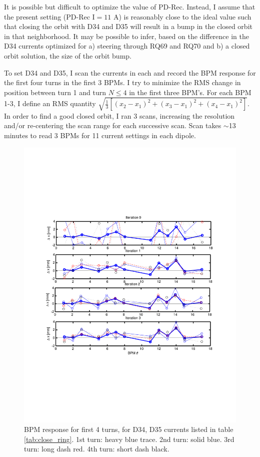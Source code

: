 It is possible but difficult to optimize the value of PD-Rec. Instead, I assume that the present setting (PD-Rec I$=11$ A) is reasonably close to the ideal value such that closing the orbit with D34 and D35 will result in a bump in the closed orbit in that neighborhood. It may be possible to infer, based on the difference in the D34 currents optimized for a) steering through RQ69 and RQ70 and b) a closed orbit solution, the size of the orbit bump. 

To set D34 and D35, I scan the currents in each and record the BPM response for the first four turns in the first 3 BPMs. I try to minimize the RMS change in position between turn 1 and turn $N\le4$ in the first three BPM's. For each BPM 1-3, I define an RMS quantity $\sqrt{\frac{1}{3}\left[ \left(x_2-x_1\right)^2+\left(x_3-x_1\right)^2+\left(x_4-x_1\right)^2\right]}$. In order to find a good closed orbit, I ran 3 scans, increasing the resolution and/or re-centering the scan range for each successive scan. Scan takes $\sim$13 minutes to read 3 BPMs for 11 current settings in each dipole. 

\begin{figure}[htb]
\centering
\includegraphics[width=\textwidth,trim={.5in 2.7in .5in 2.7in},clip]{4.figures/closing_orbit_BPMs.pdf}
\caption{BPM response for first 4 turns, for D34, D35 currents listed in table \ref{tab:close_ring}. 1st turn: heavy blue trace. 2nd turn: solid blue. 3rd turn: long dash red. 4th turn: short dash black.}
\label{fig:close_BPMs}
\end{figure}

